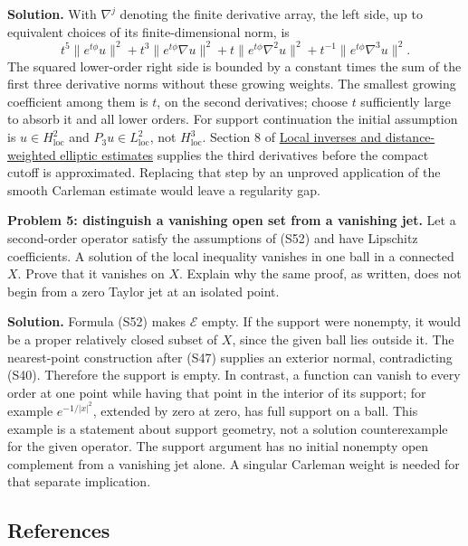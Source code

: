 \documentclass[
  11pt,
]{article}
\makeatletter
\let\ReaderOriginalAnchorStart\hyper@anchorstart
\let\ReaderOriginalAnchorEnd\hyper@anchorend
\let\ReaderPendingAliases\@empty
\def\ReaderArmAliases#1{\gdef\ReaderPendingAliases{#1}}
\def\hyper@anchorstart#1{\ReaderIfNativeAnchorTF{#1}{\ReaderPendingAliases\global\let\ReaderPendingAliases\@empty}{}\ReaderOriginalAnchorStart{#1}}
\makeatother
\begin{document}
\textbf{Solution.} With \(\nabla^j\) denoting the finite derivative
array, the left side, up to equivalent choices of its finite-dimensional
norm, is \[
 t^5\|e^{t\phi}u\|^2+
 t^3\|e^{t\phi}\nabla u\|^2+
 t\|e^{t\phi}\nabla^2u\|^2+
 t^{-1}\|e^{t\phi}\nabla^3u\|^2.
\] The squared lower-order right side is bounded by a constant times the
sum of the first three derivative norms without these growing weights.
The smallest growing coefficient among them is \(t\), on the second
derivatives; choose \(t\) sufficiently large to absorb it and all lower
orders. For support continuation the initial assumption is
\(u\in H^2_{\mathrm{loc}}\) and \(P_3u\in L^2_{\mathrm{loc}}\), not
\(H^3_{\mathrm{loc}}\). Section 8 of
\href{local-elliptic-coefficients.pdf}{Local inverses and
distance-weighted elliptic estimates} supplies the third derivatives
before the compact cutoff is approximated. Replacing that step by an
unproved application of the smooth Carleman estimate would leave a
regularity gap.

\textbf{Problem 5: distinguish a vanishing open set from a vanishing
jet.} Let a second-order operator satisfy the assumptions of (S52) and
have Lipschitz coefficients. A solution of the local inequality vanishes
in one ball in a connected \(X\). Prove that it vanishes on \(X\).
Explain why the same proof, as written, does not begin from a zero
Taylor jet at an isolated point.

\textbf{Solution.} Formula (S52) makes \(\mathcal E\) empty. If the
support were nonempty, it would be a proper relatively closed subset of
\(X\), since the given ball lies outside it. The nearest-point
construction after (S47) supplies an exterior normal, contradicting
(S40). Therefore the support is empty. In contrast, a function can
vanish to every order at one point while having that point in the
interior of its support; for example \(e^{-1/|x|^2}\), extended by zero
at zero, has full support on a ball. This example is a statement about
support geometry, not a solution counterexample for the given operator.
The support argument has no initial nonempty open complement from a
vanishing jet alone. A singular Carleman weight is needed for that
separate implication.

\ReaderArmAliases{\ReaderOriginalAnchorStart{reading-and-research-routes}\ReaderOriginalAnchorEnd\begingroup\expandafter\def\csname @currentHref\endcsname{reading-and-research-routes}\label{reading-and-research-routes}\endgroup\ReaderOriginalAnchorStart{references}\ReaderOriginalAnchorEnd}
\subsection{References}\label{references}
\end{document}
